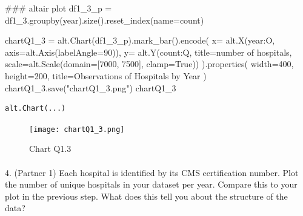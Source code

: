 \documentclass[
  letterpaper,
  DIV=11,
  numbers=noendperiod]{scrartcl}
\makeatletter
\let\oldparagraph\paragraph
\renewcommand{\paragraph}{
    \@ifstar
      \xxxParagraphStar
      \xxxParagraphNoStar
  }
\newcommand{\xxxParagraphStar}[1]{\oldparagraph*{#1}\mbox{}}
\newcommand{\xxxParagraphNoStar}[1]{\oldparagraph{#1}\mbox{}}
\newenvironment{Shaded}{\begin{snugshade}}{\end{snugshade}}
\newcommand{\CommentTok}[1]{\textcolor[rgb]{0.37,0.37,0.37}{#1}}
\newcommand{\DecValTok}[1]{\textcolor[rgb]{0.68,0.00,0.00}{#1}}
\newcommand{\NormalTok}[1]{\textcolor[rgb]{0.00,0.23,0.31}{#1}}
\newcommand{\OperatorTok}[1]{\textcolor[rgb]{0.37,0.37,0.37}{#1}}
\newcommand{\StringTok}[1]{\textcolor[rgb]{0.13,0.47,0.30}{#1}}
\newcommand{\VariableTok}[1]{\textcolor[rgb]{0.07,0.07,0.07}{#1}}
\makeatother
\begin{document}
\begin{Shaded}
\begin{Highlighting}[]
\CommentTok{\#\#\# altair plot}
\NormalTok{df1\_3\_p }\OperatorTok{=}\NormalTok{ df1\_3.groupby(}\StringTok{\textquotesingle{}year\textquotesingle{}}\NormalTok{).size().reset\_index(name}\OperatorTok{=}\StringTok{\textquotesingle{}count\textquotesingle{}}\NormalTok{)}

\NormalTok{chartQ1\_3 }\OperatorTok{=}\NormalTok{ alt.Chart(df1\_3\_p).mark\_bar().encode(}
\NormalTok{    x}\OperatorTok{=}\NormalTok{ alt.X(}\StringTok{\textquotesingle{}year:O\textquotesingle{}}\NormalTok{, axis}\OperatorTok{=}\NormalTok{alt.Axis(labelAngle}\OperatorTok{=}\DecValTok{90}\NormalTok{)),}
\NormalTok{    y}\OperatorTok{=}\NormalTok{ alt.Y(}\StringTok{\textquotesingle{}count:Q\textquotesingle{}}\NormalTok{, title}\OperatorTok{=}\StringTok{\textquotesingle{}number of hospitals\textquotesingle{}}\NormalTok{, scale}\OperatorTok{=}\NormalTok{alt.Scale(domain}\OperatorTok{=}\NormalTok{[}\DecValTok{7000}\NormalTok{, }\DecValTok{7500}\NormalTok{], clamp}\OperatorTok{=}\VariableTok{True}\NormalTok{))}
\NormalTok{).properties(}
\NormalTok{    width}\OperatorTok{=}\DecValTok{400}\NormalTok{, }
\NormalTok{    height}\OperatorTok{=}\DecValTok{200}\NormalTok{, }
\NormalTok{    title}\OperatorTok{=}\StringTok{\textquotesingle{}Observations of Hospitals by Year\textquotesingle{}}  
\NormalTok{)}
\NormalTok{chartQ1\_3.save(}\StringTok{"chartQ1\_3.png"}\NormalTok{)}
\NormalTok{chartQ1\_3}
\end{Highlighting}
\end{Shaded}

\begin{verbatim}
alt.Chart(...)
\end{verbatim}

\begin{figure}[H]

{\centering \texttt{[image: chartQ1\_3.png]}

}

\caption{Chart Q1.3}

\end{figure}%

\paragraph{4. (Partner 1) Each hospital is identified by its CMS
certification number. Plot the number of unique hospitals in your
dataset per year. Compare this to your plot in the previous step. What
does this tell you about the structure of the
data?}\label{partner-1-each-hospital-is-identified-by-its-cms-certification-number.-plot-the-number-of-unique-hospitals-in-your-dataset-per-year.-compare-this-to-your-plot-in-the-previous-step.-what-does-this-tell-you-about-the-structure-of-the-data}
\end{document}

